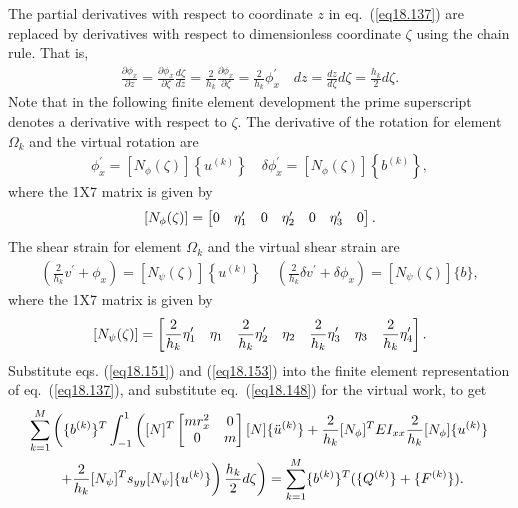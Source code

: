 \documentclass{AeroStructure-ERJohnson}
\begin{document}
The partial derivatives with respect to coordinate $z$ in eq.~(\ref{eq18.137}) are replaced by derivatives with respect to dimensionless coordinate $\zeta$ using the chain rule. That is,
\begin{align}\label{eq18.150}
\frac{\partial \phi_{x}}{\partial z}=\frac{\partial \phi_{x}}{\partial \zeta} \frac{d \zeta}{d z}=\frac{2}{h_{k}} \frac{\partial \phi_{x}}{\partial \zeta}=\frac{2}{h_{k}} \phi_{x}^{\prime} \quad d z=\frac{d z}{d \zeta} d \zeta=\frac{h_{k}}{2} d \zeta.
\end{align}
Note that in the following finite element development the prime superscript denotes a derivative with respect to $\zeta$. The derivative of the rotation for element $\Omega_k$ and the virtual rotation are
\begin{align}\label{eq18.151}
\phi_{x}^{\prime}=\left[N_{\phi}(\zeta)\right]\left\{u^{(k)}\right\} \quad \delta \phi_{x}^{\prime}=\left[N_{\phi}(\zeta)\right]\left\{b^{(k)}\right\},
\end{align}
where the 1X7 matrix is given by
\begin{align}\label{eq18.152}
\left[N_{\phi}(\zeta)\right]=\left[\begin{array}{@{}lllllll@{}}0 & \eta_{1}^{\prime} & 0 & \eta_{2}^{\prime} & 0 & \eta_{3}^{\prime} & 0\end{array}\right].
\end{align}
The shear strain for element $\Omega_k$ and the virtual shear strain are
\begin{align}\label{eq18.153}
\left(\frac{2}{h_{k}} v^{\prime}+\phi_{x}\right)=\left[N_{\psi}(\zeta)\right]\left\{u^{(k)}\right\} \quad\left(\frac{2}{h_{k}} \delta v^{\prime}+\delta \phi_{x}\right)=\left[N_{\psi}(\zeta)\right]\{b\},
\end{align}
where the 1X7 matrix is given by
\begin{align}\label{eq18.154}
\left[N_{\psi}(\zeta)\right]=\left[
\begin{array}{@{}lllllll@{}}
\displaystyle\frac{2}{h_{k}} \eta_{1}^{\prime} & \eta_{1} & \displaystyle\frac{2}{h_{k}} \eta_{2}^{\prime} & \eta_{2} & \displaystyle\frac{2}{h_{k}} \eta_{3}^{\prime} & \eta_{3} & \displaystyle\frac{2}{h_{k}} \eta_{4}^{\prime}\end{array}\right].
\end{align}
Substitute eqs. (\ref{eq18.151}) and (\ref{eq18.153}) into the finite element representation of eq.~(\ref{eq18.137}), and substitute eq.~(\ref{eq18.148}) for the virtual work, to get
\begin{align}
&\sum_{k=1}^{M}\left(\{b^{(k)}\}^{T} \int_{-1}^{1}\left([N]^{T}\left[\begin{array}{@{}cc@{}}m r_{x}^{2} & 0 \\0 & m\end{array}\right][N]\{\ddot{u}^{(k)}\}+\frac{2}{h_{k}}[N_{\phi}]^{T} E I_{x x} \frac{2}{h_{k}}[N_{\phi}]\{u^{(k)}\}\right.\right.\nonumber\\
&\qquad\left.\left.+\frac{2}{h_{k}}[N_{\psi}]^{T} s_{y y}[N_{\psi}]\{u^{(k)}\}\right) \frac{h_{k}}{2} d \zeta\right)
=\sum_{k=1}^M\{b^{(k)}\}^{T}(\{Q^{(k)}\}+\{F^{(k)}\}). \label{eq18.155}
\end{align}
\end{document}
